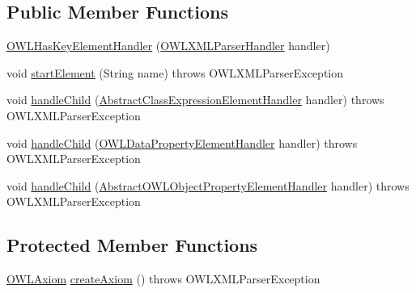\subsection*{Public Member Functions}
\begin{DoxyCompactItemize}
\item 
\hyperlink{classorg_1_1coode_1_1owlapi_1_1owlxmlparser_1_1_o_w_l_has_key_element_handler_a8104c8600bfbf16dd42c8b5ec9adfdc6}{O\-W\-L\-Has\-Key\-Element\-Handler} (\hyperlink{classorg_1_1coode_1_1owlapi_1_1owlxmlparser_1_1_o_w_l_x_m_l_parser_handler}{O\-W\-L\-X\-M\-L\-Parser\-Handler} handler)
\item 
void \hyperlink{classorg_1_1coode_1_1owlapi_1_1owlxmlparser_1_1_o_w_l_has_key_element_handler_a1263739690e9dc931b74df2817c3a613}{start\-Element} (String name)  throws O\-W\-L\-X\-M\-L\-Parser\-Exception 
\item 
void \hyperlink{classorg_1_1coode_1_1owlapi_1_1owlxmlparser_1_1_o_w_l_has_key_element_handler_a61b041da72d6c4331747e3cbec40ea4c}{handle\-Child} (\hyperlink{classorg_1_1coode_1_1owlapi_1_1owlxmlparser_1_1_abstract_class_expression_element_handler}{Abstract\-Class\-Expression\-Element\-Handler} handler)  throws O\-W\-L\-X\-M\-L\-Parser\-Exception 
\item 
void \hyperlink{classorg_1_1coode_1_1owlapi_1_1owlxmlparser_1_1_o_w_l_has_key_element_handler_a7dc20fba50167e2e663911dcfe2ecf02}{handle\-Child} (\hyperlink{classorg_1_1coode_1_1owlapi_1_1owlxmlparser_1_1_o_w_l_data_property_element_handler}{O\-W\-L\-Data\-Property\-Element\-Handler} handler)  throws O\-W\-L\-X\-M\-L\-Parser\-Exception 
\item 
void \hyperlink{classorg_1_1coode_1_1owlapi_1_1owlxmlparser_1_1_o_w_l_has_key_element_handler_a3f61232564c16fd79409109631a1feb6}{handle\-Child} (\hyperlink{classorg_1_1coode_1_1owlapi_1_1owlxmlparser_1_1_abstract_o_w_l_object_property_element_handler}{Abstract\-O\-W\-L\-Object\-Property\-Element\-Handler} handler)  throws O\-W\-L\-X\-M\-L\-Parser\-Exception 
\end{DoxyCompactItemize}
\subsection*{Protected Member Functions}
\begin{DoxyCompactItemize}
\item 
\hyperlink{interfaceorg_1_1semanticweb_1_1owlapi_1_1model_1_1_o_w_l_axiom}{O\-W\-L\-Axiom} \hyperlink{classorg_1_1coode_1_1owlapi_1_1owlxmlparser_1_1_o_w_l_has_key_element_handler_a38325ba89163b8ab4c109fe2d8e843ea}{create\-Axiom} ()  throws O\-W\-L\-X\-M\-L\-Parser\-Exception 
\end{DoxyCompactItemize}
